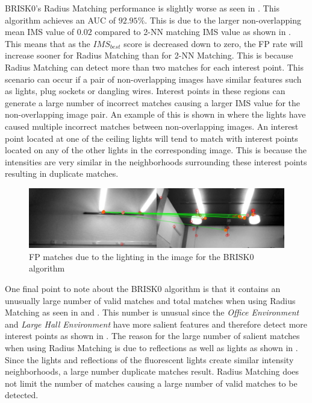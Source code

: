 \documentclass[11pt]{report}
\begin{document}
BRISK0's Radius Matching performance is slightly worse as seen in . This algorithm achieves an AUC of $92.95\%$. This is due to the larger non-overlapping mean IMS value of $0.02$ compared to 2-NN matching IMS value as shown in . This means that as the $IMS_{best}$ score is decreased down to zero, the FP rate will increase sooner for Radius Matching than for 2-NN Matching. This is because Radius Matching can detect more than two matches for each interest point. This scenario can occur if a pair of non-overlapping images have similar features such as lights, plug sockets or dangling wires. Interest points in these regions can generate a large number of incorrect matches causing a larger IMS value for the non-overlapping image pair. An example of this is shown in  where the lights have caused multiple incorrect matches between non-overlapping images. An interest point located at one of the ceiling lights will tend to match with interest points located on any of the other lights in the corresponding image. This is because the intensities are very similar in the neighborhoods surrounding these interest points resulting in duplicate matches. \\

\begin{figure}
  \centering
    \includegraphics[width=1.0\textwidth]{../Drawings/Matching/fpMatchBRISK0.jpg}
    \caption{FP matches due to the lighting in the image for the BRISK0 algorithm} 
    \label{fig:duplicateMatchesBrisk0}
\end{figure}

One final point to note about the BRISK0 algorithm is that it contains an unusually large number of valid matches and total matches when using Radius Matching as seen in  and . This number is unusual since the \textit{Office Environment} and \textit{Large Hall Environment} have more salient features and therefore detect more interest points as shown in . The reason for the large number of salient matches when using Radius Matching is due to reflections as well as lights as shown in . Since the lights and reflections of the fluorescent lights create similar intensity neighborhoods, a large number duplicate matches result. Radius Matching does not limit the number of matches causing a large number of valid matches to be detected.\\
\end{document}
